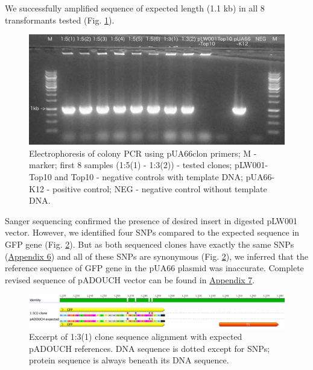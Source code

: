 We successfully amplified sequence of expected length (1.1 kb) in all 8 transformants tested (Fig. \ref{colonyPCR}).
\begin{figure}[h!]
  \centering
  \includegraphics[scale=0.2]{text/Pictures/ColonyPCR.jpg}
	\caption{Electrophoresis of colony PCR using pUA66\textunderscore clon primers; M - marker; first 8 samples (1:5(1) - 1:3(2)) - tested clones; pLW001-Top10 and Top10 - negative controls with template DNA; pUA66-K12 - positive control; NEG - negative control without template DNA.}
	\label{colonyPCR}
\end{figure}
Sanger sequencing confirmed the presence of desired insert in digested pLW001 vector.
However, we identified four SNPs compared to the expected sequence in GFP gene (Fig. \ref{1:3(1)seq}).
But as both sequenced clones have exactly the same SNPs (\hyperlink{pADOUCHseq}{Appendix 6}) and all of these SNPs are synonymous (Fig. \ref{1:3(1)seq}), we inferred that the reference sequence of GFP gene in the pUA66 plasmid was inaccurate.
Complete revised sequence of pADOUCH vector can be found in \hyperlink{pADOUCHwhole}{Appendix 7}.
\begin{figure}[ht]
  \centering
  \includegraphics[scale=0.26]{text/Pictures/pADOUCHseq.png}
	\caption{Excerpt of 1:3(1) clone sequence alignment with expected pADOUCH references. DNA sequence is dotted except for SNPs; protein sequence is always beneath its DNA sequence.}
	\label{1:3(1)seq}
\end{figure}

\shorthandon{-} 



